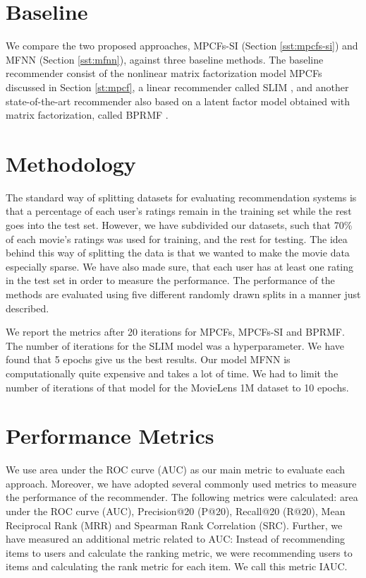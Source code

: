 \section{Baseline}
\label{st:baseline}

We compare the two proposed approaches, MPCFs-SI (Section \ref{sst:mpcfs-si}) and MFNN (Section \ref{sst:mfnn}), against three baseline methods.
The baseline recommender consist of the nonlinear matrix factorization model MPCFs discussed in Section \ref{st:mpcf}, a linear recommender called SLIM \cite{Ning2011}, and another state-of-the-art recommender also based on a latent factor model obtained with matrix factorization, called BPRMF \cite{Rendle2009}.

\section{Methodology}
\label{st:methodology}
The standard way of splitting datasets for evaluating recommendation systems is that a percentage of each user's ratings remain in the training set while the rest goes into the test set.
However, we have subdivided our datasets, such that 70\% of each movie's ratings was used for training, and the rest for testing.
The idea behind this way of splitting the data is that we wanted to make the movie data especially sparse.
We have also made sure, that each user has at least one rating in the test set in order to measure the performance.
The performance of the methods are evaluated using five different randomly drawn splits in a manner just described.

We report the metrics after 20 iterations for MPCFs, MPCFs-SI and BPRMF.
The number of iterations for the SLIM model was a hyperparameter.
We have found that 5 epochs give us the best results.
Our model MFNN is computationally quite expensive and takes a lot of time.
We had to limit the number of iterations of that model for the MovieLens 1M dataset to 10 epochs.

\section{Performance Metrics}
\label{st:performance-metrics}
We use area under the ROC curve (AUC) as our main metric to evaluate each approach.
Moreover, we have adopted several commonly used metrics to measure the performance of the recommender.
The following metrics were calculated: area under the ROC curve (AUC), Precision@20 (P@20), Recall@20 (R@20), Mean Reciprocal Rank (MRR) and Spearman Rank Correlation (SRC).
Further, we have measured an additional metric related to AUC: Instead of recommending items to users and calculate the ranking metric, we were recommending users to items and calculating the rank metric for each item.
We call this metric IAUC.


